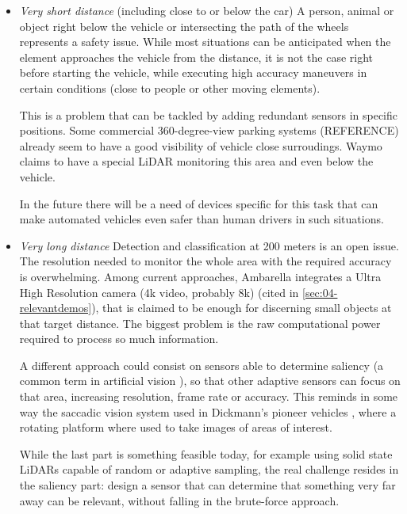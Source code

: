 \begin{itemize}
    \item \emph{Very short distance} (including close to or below the 
    car)
        A person, animal or object right below the vehicle or intersecting 
        the path of the wheels represents a safety issue. While most situations
        can be anticipated when the element approaches the vehicle from the
        distance, it is not the case right before starting the vehicle, 
        while executing high accuracy maneuvers in certain conditions 
        (close to people or other moving elements).  
        
        This is a problem that can be tackled by adding redundant sensors in 
        specific positions. Some commercial 360-degree-view parking systems 
        (REFERENCE) already seem to have a good visibility of vehicle close 
        surroudings. Waymo claims to have a special LiDAR monitoring this area
        and even below the vehicle. 
        
        In the future there will be a need of devices specific for this task 
        that can make automated vehicles even safer than human drivers in such 
        situations.
          
    \item \emph{Very long distance} 
        Detection and classification at 200 meters is an open issue.
        The resolution needed to monitor the whole area with the required 
        accuracy is overwhelming. Among current approaches, Ambarella 
        integrates a Ultra High Resolution camera (4k video, probably 8k) 
        (cited in \ref{sec:04-relevantdemos}), that is claimed to be enough for 
        discerning small objects at that target distance. The biggest problem
        is the raw computational power required to process so much information.
        
        A different approach could consist on sensors able to determine 
        saliency (a common term in artificial vision 
        \cite{Zhang2016a,Palazzi2018,Duthon2016}), 
        so that other adaptive sensors can focus on that area, increasing
        resolution, frame rate or accuracy. 
        This reminds in some way the saccadic vision system used in Dickmann's 
        pioneer vehicles \cite{Dickmanns1987,Gregor2002}, where a rotating 
        platform where used to take images of areas of interest.
        
        While the last part is something feasible today, for example using solid
        state LiDARs capable of random or adaptive sampling, the real challenge
        resides in the saliency part: design a sensor that can determine that 
        something very far away can be relevant, without falling in the
        brute-force approach.
        

\end{itemize}
